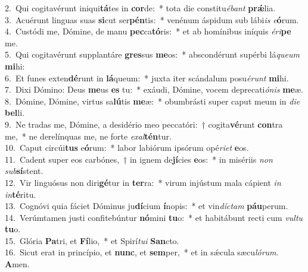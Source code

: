 {2.~}Qui cogitavérunt iniqui\textbf{tá}tes in \textbf{cor}de:~* tota die constitu\textit{é}\textit{bant} \textbf{prǽ}lia.\\
{3.~}Acuérunt linguas suas \textbf{si}cut ser\textbf{pén}tis:~* venénum áspidum sub lábi\textit{is} \textit{e}\textbf{ó}rum.\\
{4.~}Custódi me, Dómine, de manu \textbf{pec}ca\textbf{tó}ris:~* et ab homínibus iníquis \textit{é}\textit{ri}\textbf{pe} me.\\
{5.~}Qui cogitavérunt supplantáre \textbf{gres}sus \textbf{me}os:~* abscondérunt supérbi lá\textit{que}\textit{um} \textbf{mi}hi:\\
{6.~}Et funes exten\textbf{dé}runt in \textbf{lá}queum:~* juxta iter scándalum posu\textit{é}\textit{runt} \textbf{mi}hi.\\
{7.~}Dixi Dómino: Deus \textbf{me}us \textbf{es} tu:~* exáudi, Dómine, vocem deprecati\textit{ó}\textit{nis} \textbf{me}æ.\\
{8.~}Dómine, Dómine, virtus sa\textbf{lú}tis \textbf{me}æ:~* obumbrásti super caput meum in \textit{di}\textit{e} \textbf{bel}li.\\
{9.~}Ne tradas me, Dómine, a desidério meo peccatóri:~† cogita\textbf{vé}runt \textbf{con}tra me,~* ne derelínquas me, ne forte \textit{e}\textit{xal}\textbf{tén}tur.\\
{10.~}Caput circúi\textbf{tus} e\textbf{ó}rum:~* labor labiórum ipsórum opé\textit{ri}\textit{et} \textbf{e}os.\\
{11.~}Cadent super eos carbónes,~† in ignem de\textbf{jí}cies \textbf{e}os:~* in misériis \textit{non} \textit{sub}\textbf{sí}stent.\\
{12.~}Vir linguósus non diri\textbf{gé}tur in \textbf{ter}ra:~* virum injústum mala cápient \textit{in} \textit{in}\textbf{té}ritu.\\
{13.~}Cognóvi quia fáciet Dóminus ju\textbf{dí}cium \textbf{í}nopis:~* et vin\textit{dí}\textit{ctam} \textbf{páu}perum.\\
{14.~}Verúmtamen justi confitebúntur \textbf{nó}mini \textbf{tu}o:~* et habitábunt recti cum \textit{vul}\textit{tu} \textbf{tu}o.\\
{15.~}Glória \textbf{Pa}tri, et \textbf{Fí}lio,~* et Spirí\textit{tu}\textit{i} \textbf{San}cto.\\
{16.~}Sicut erat in princípio, et \textbf{nunc}, et \textbf{sem}per,~* et in sǽcula sæcu\textit{ló}\textit{rum}. \textbf{A}men.\\
